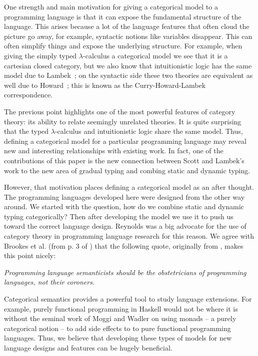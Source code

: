 One strength and main motivation for giving a categorical model to a
programming language is that it can expose the fundamental structure
of the language.  This arises because a lot of the language features
that often cloud the picture go away, for example, syntactic notions
like variables disappear.  This can often simplify things and expose
the underlying structure.  For example, when giving the simply typed
$\lambda$-calculus a categorical model we see that it is a cartesian
closed category, but we also know that intuitionistic logic has the
same model due to Lambek~\cite{Lambek:1980}; on the syntactic side
these two theories are equivalent as well due to
Howard~\cite{Howard:1980}; this is known as the Curry-Howard-Lambek
correspondence.

The previous point highlights one of the most powerful features of
category theory: its ability to relate seemingly unrelated theories.
It is quite surprising that the typed $\lambda$-calculus and
intuitionistic logic share the same model.  Thus, defining a
categorical model for a particular programming language may reveal new
and interesting relationships with existing work.  In fact, one of the
contributions of this paper is the new connection between Scott and
Lambek's work to the new area of gradual typing and combing static and
dynamic typing.

However, that motivation places defining a categorical model as an
after thought.  The programming languages developed here were designed
from the other way around.  We started with the question, how do we
combine static and dynamic typing categorically? Then after developing
the model we use it to push us toward the correct language design.
Reynolds \cite{Brookes:2013} was a big advocate for the use of
category theory in programming language research for this reason.  We
agree with Brookes et al. (from p. 3 of \cite{Brookes:2013}) that the
following quote, originally from \cite{?}, makes this point nicely:
\begin{center}
  \parbox{170pt}{
    \emph{Programming language semanticists should be the obstetricians
    of programming languages, not their coroners.\\
    {}}}
\end{center}

Categorical semantics provides a powerful tool to study language
extensions.  For example, purely functional programming in Haskell
would not be where it is without the seminal work of Moggi and Wadler
\cite{Moggi:1989,Wadler:1995} on using monads -- a purely categorical
notion -- to add side effects to to pure functional programming
languages.  Thus, we believe that developing these types of models for
new language designs and features can be hugely beneficial.

